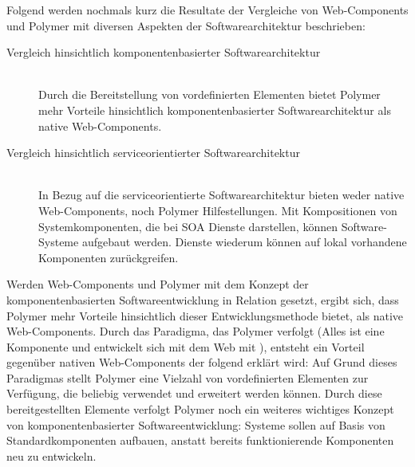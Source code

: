 Folgend werden nochmals kurz die Resultate der Vergleiche von Web-Components und Polymer mit diversen Aspekten der Softwarearchitektur beschrieben:

\begin{description}
\item[Vergleich hinsichtlich komponentenbasierter Softwarearchitektur] \hfill \\
Durch die Bereitstellung von vordefinierten Elementen bietet Polymer mehr Vorteile hinsichtlich komponentenbasierter Softwarearchitektur als native Web-Components.

\item[Vergleich hinsichtlich serviceorientierter Softwarearchitektur] \hfill \\
In Bezug auf die serviceorientierte Softwarearchitektur bieten weder native Web-Components, noch Polymer Hilfestellungen. Mit Kompositionen von Systemkomponenten, die bei SOA Dienste darstellen, können Software-Systeme aufgebaut werden. Dienste wiederum können auf lokal vorhandene Komponenten zurückgreifen.
\end{description}

Werden Web-Components und Polymer mit dem Konzept der komponentenbasierten Softwareentwicklung in Relation gesetzt, ergibt sich, dass Polymer mehr Vorteile hinsichtlich dieser Entwicklungsmethode bietet, als native Web-Components. Durch das Paradigma, das Polymer verfolgt (\glqq Alles ist eine Komponente und entwickelt sich mit dem Web mit \grqq ), entsteht ein Vorteil gegenüber nativen Web-Components der folgend erklärt wird: Auf Grund dieses Paradigmas stellt Polymer eine Vielzahl von vordefinierten Elementen zur Verfügung, die beliebig verwendet und erweitert werden können. Durch diese bereitgestellten Elemente verfolgt Polymer noch ein weiteres wichtiges Konzept von komponentenbasierter Softwareentwicklung: Systeme sollen auf Basis von Standardkomponenten aufbauen, anstatt bereits funktionierende Komponenten neu zu entwickeln.

